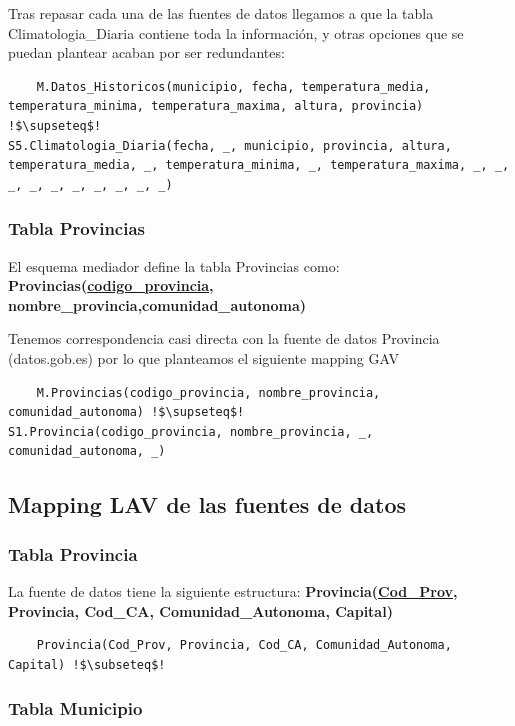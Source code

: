 \documentclass[12pt, a4paper]{article}
\begin{document}
Tras repasar cada una de las fuentes de datos llegamos a que la tabla Climatologia\_Diaria contiene toda la información, y otras opciones que se puedan plantear acaban por ser redundantes:
\begin{lstlisting}
    M.Datos_Historicos(municipio, fecha, temperatura_media, temperatura_minima, temperatura_maxima, altura, provincia) !$\supseteq$!
S5.Climatologia_Diaria(fecha, _, municipio, provincia, altura, temperatura_media, _, temperatura_minima, _, temperatura_maxima, _, _, _, _, _, _, _, _, _, _)
\end{lstlisting}

\subsubsection{Tabla Provincias}

El esquema mediador define la tabla Provincias como:\\
\textbf{Provincias(\underline{codigo\_provincia}, nombre\_provincia,comunidad\_autonoma)}

Tenemos correspondencia casi directa con la fuente de datos Provincia (datos.gob.es) por lo que planteamos el siguiente mapping GAV
\begin{lstlisting}
    M.Provincias(codigo_provincia, nombre_provincia, comunidad_autonoma) !$\supseteq$!
S1.Provincia(codigo_provincia, nombre_provincia, _, comunidad_autonoma, _)
\end{lstlisting}

\subsection{Mapping LAV de las fuentes de datos}

\subsubsection{Tabla Provincia}

La fuente de datos tiene la siguiente estructura:
\textbf{Provincia(\underline{Cod\_Prov}, Provincia, Cod\_CA, Comunidad\_Autonoma, Capital)}

\begin{lstlisting}
    Provincia(Cod_Prov, Provincia, Cod_CA, Comunidad_Autonoma, Capital) !$\subseteq$!
\end{lstlisting}

\subsubsection{Tabla Municipio}
\end{document}
